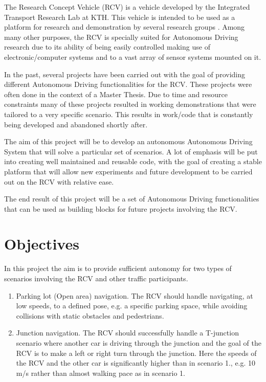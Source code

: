 \documentclass[11pt,a4paper]{article}
\begin{document}
The Research Concept Vehicle (RCV) is a vehicle developed by the
Integrated Transport Research Lab at KTH. This vehicle is intended to be used as a platform for research and demonstration by several research groups \cite{rcv_webpage}. Among many other purposes, the RCV is specially suited for Autonomous Driving research due to its ability of being easily controlled making use of electronic/computer systems and to a vast array of sensor systems mounted on it.

In the past, several projects have been carried out with the goal of providing different Autonomous Driving functionalities for the RCV. These projects were often 
done in the context of a Master Thesis. Due to time and resource constraints
many of these projects resulted in working demonstrations that were tailored
to a very specific scenario. This results in work/code that is constantly being 
developed and abandoned shortly after.

The aim of this project will be to develop an autonomous Autonomous Driving System that will solve a particular set of scenarios. A lot of emphasis will be put into creating well maintained and reusable code, with the goal of creating a stable platform that will allow new experiments and future development to be carried out on the RCV with relative ease.

The end result of this project will be a set of Autonomous Driving functionalities that can be used as building blocks for future projects involving the RCV.


\section{Objectives}

In this project the aim is to provide sufficient autonomy for two
types of scenarios involving the RCV and other traffic participants.


\begin{enumerate}
\item  Parking lot (Open area) navigation. The RCV should handle navigating,
at low speeds, to a defined pose, e.g. a specific parking space, while
avoiding collisions with static obstacles and pedestrians. 


\item  Junction navigation. The RCV should successfully handle a T-junction
scenario where another car is driving through the junction and the
goal of the RCV is to make a left or right turn through the
junction. Here the speeds of the RCV and the other car is
significantly higher than in scenario 1., e.g. 10 m/s rather than
almost walking pace as in scenario 1.



\end{enumerate}
\end{document}

